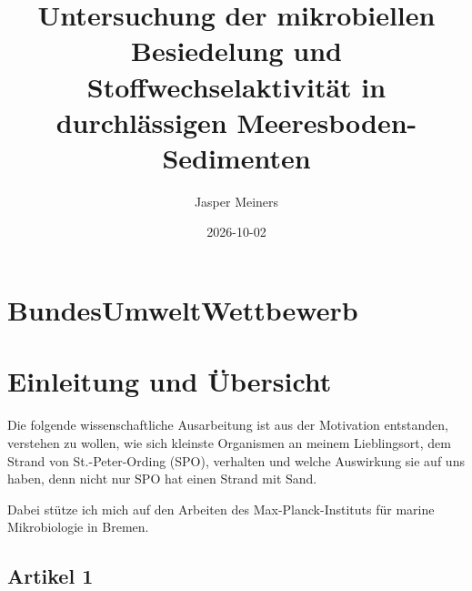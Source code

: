 \documentclass[
  ngerman,
  14pt,
  a4paper,
  DIV=11,
  twoside]{scrreprt}
\title{Untersuchung der mikrobiellen Besiedelung und
Stoffwechselaktivität in durchlässigen Meeresboden-Sedimenten}
\author{Jasper Meiners}
\date{2026-10-02}
\renewcommand*\contentsname{Inhaltsverzeichnis}
\newcommand\contentsname{Inhaltsverzeichnis}
\begin{document}
\maketitle

\renewcommand*\contentsname{Inhaltsverzeichnis}
{
\setcounter{tocdepth}{2}
\tableofcontents
}


\chapter*{BundesUmweltWettbewerb}\label{bundesumweltwettbewerb}



\chapter{Einleitung und Übersicht}\label{einleitung-und-uxfcbersicht}

Die folgende wissenschaftliche Ausarbeitung ist aus der Motivation
entstanden, verstehen zu wollen, wie sich kleinste Organismen an meinem
Lieblingsort, dem Strand von St.-Peter-Ording (SPO), verhalten und
welche Auswirkung sie auf uns haben, denn nicht nur SPO hat einen Strand
mit Sand.

Dabei stütze ich mich auf den Arbeiten des Max-Planck-Instituts für
marine Mikrobiologie in Bremen.

\section{Artikel 1}\label{artikel-1}
\end{document}
